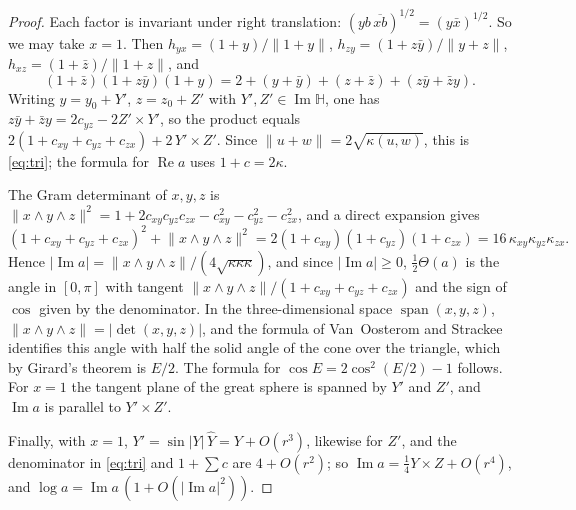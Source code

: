 \documentclass[11pt,reqno]{amsart}
\theoremstyle{definition}
\theoremstyle{remark}
\numberwithin{equation}{section}
\newcommand{\HH}{\mathbb{H}}
\newcommand{\re}{\operatorname{Re}}
\newcommand{\im}{\operatorname{Im}}
\begin{document}
\begin{proof}
Each factor is invariant under right translation: $(yb\,\overline{xb})^{1/2}=(y\bar x)^{1/2}$.  So we may take
$x=1$.  Then $h_{yx}=(1+y)/\lVert1+y\rVert$, $h_{zy}=(1+z\bar y)/\lVert y+z\rVert$, $h_{xz}=(1+\bar z)/\lVert1+z\rVert$,
and
\[
(1+\bar z)(1+z\bar y)(1+y)=2+(y+\bar y)+(z+\bar z)+(z\bar y+\bar zy).
\]
Writing $y=y_0+Y'$, $z=z_0+Z'$ with $Y',Z'\in\im\HH$, one has $z\bar y+\bar zy=2c_{yz}-2Z'\times Y'$, so the product
equals $2(1+c_{xy}+c_{yz}+c_{zx})+2\,Y'\times Z'$.  Since $\lVert u+w\rVert=2\sqrt{\kappa(u,w)}$, this is
\eqref{eq:tri}; the formula for $\re a$ uses $1+c=2\kappa$.

The Gram determinant of $x,y,z$ is $\lVert x\wedge y\wedge z\rVert^2=1+2c_{xy}c_{yz}c_{zx}-c_{xy}^2-c_{yz}^2-c_{zx}^2$, and
a direct expansion gives
\[
(1+c_{xy}+c_{yz}+c_{zx})^2+\lVert x\wedge y\wedge z\rVert^2=2(1+c_{xy})(1+c_{yz})(1+c_{zx})=16\,\kappa_{xy}\kappa_{yz}\kappa_{zx}.
\]
Hence $\lvert\im a\rvert=\lVert x\wedge y\wedge z\rVert/(4\sqrt{\kappa\kappa\kappa})$, and since $\lvert\im a\rvert\ge0$,
$\tfrac12\Theta(a)$ is the angle in $[0,\pi]$ with tangent $\lVert x\wedge y\wedge z\rVert/(1+c_{xy}+c_{yz}+c_{zx})$ and
the sign of $\cos$ given by the denominator.  In the three-dimensional space $\operatorname{span}(x,y,z)$,
$\lVert x\wedge y\wedge z\rVert=\lvert\det(x,y,z)\rvert$, and the formula of Van~Oosterom and Strackee
\cite{VOS,Eriksson} identifies this angle with half the solid angle of the cone over the triangle, which by
Girard's theorem is $E/2$.  The formula for $\cos E=2\cos^2(E/2)-1$ follows.  For $x=1$ the tangent plane of the
great sphere is spanned by $Y'$ and $Z'$, and $\im a$ is parallel to $Y'\times Z'$.

Finally, with $x=1$, $Y'=\sin\lvert Y\rvert\,\hat Y=Y+O(r^3)$, likewise for $Z'$, and the denominator in
\eqref{eq:tri} and $1+\sum c$ are $4+O(r^2)$; so $\im a=\tfrac14Y\times Z+O(r^4)$, and
$\log a=\im a\,(1+O(\lvert\im a\rvert^2))$.
\end{proof}
\end{document}
